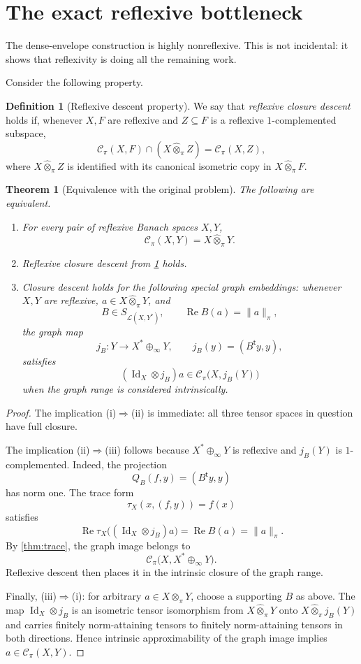 \documentclass[11pt]{article}
\newtheorem{theorem}{Theorem}[section]
\theoremstyle{definition}
\newtheorem{definition}[definition]{Definition}
\theoremstyle{remark}
\newcommand{\whot}{\widehat\otimes_\pi}
\newcommand{\Lin}{\mathcal L}
\newcommand{\Rea}{\operatorname{Re}}
\newcommand{\id}{\operatorname{Id}}
\newcommand{\Cpi}{\mathscr C_\pi}
\begin{document}
\section{The exact reflexive bottleneck}

The dense-envelope construction is highly nonreflexive.  This is not incidental: it shows that reflexivity is doing all the remaining work.

Consider the following property.

\begin{definition}[Reflexive descent property]\label{def:RD}
We say that \emph{reflexive closure descent} holds if, whenever $X,F$ are reflexive and $Z\subseteq F$ is a reflexive $1$-complemented subspace,
\[
 \Cpi(X,F)\cap(X\whot Z)=\Cpi(X,Z),
\]
where $X\whot Z$ is identified with its canonical isometric copy in $X\whot F$.
\end{definition}

\begin{theorem}[Equivalence with the original problem]\label{thm:equivalence}
The following are equivalent.
\begin{enumerate}[label=\textup{(\roman*)}]
\item For every pair of reflexive Banach spaces $X,Y$,
\[
 \Cpi(X,Y)=X\whot Y.
\]
\item Reflexive closure descent from \cref{def:RD} holds.
\item Closure descent holds for the following special graph embeddings: whenever $X,Y$ are reflexive, $a\in X\whot Y$, and
\[
 B\in S_{\Lin(X,Y^*)},
 \qquad
 \Rea B(a)=\|a\|_\pi,
\]
the graph map
\[
 j_B:Y\to X^*\oplus_\infty Y,
 \qquad
 j_B(y)=(B^{\mathsf t}y,y),
\]
satisfies
\[
 (\id_X\otimes j_B)a
 \in\Cpi\bigl(X,j_B(Y)\bigr)
\]
when the graph range is considered intrinsically.
\end{enumerate}
\end{theorem}

\begin{proof}
The implication (i)$\Rightarrow$(ii) is immediate: all three tensor spaces in question have full closure.

The implication (ii)$\Rightarrow$(iii) follows because $X^*\oplus_\infty Y$ is reflexive and $j_B(Y)$ is $1$-complemented.  Indeed, the projection
\[
 Q_B(f,y)=(B^{\mathsf t}y,y)
\]
has norm one.  The trace form
\[
 \tau_X(x,(f,y))=f(x)
\]
satisfies
\[
 \Rea\tau_X\bigl((\id_X\otimes j_B)a\bigr)
 =\Rea B(a)
 =\|a\|_\pi.
\]
By \cref{thm:trace}, the graph image belongs to
\[
 \Cpi\bigl(X,X^*\oplus_\infty Y\bigr).
\]
Reflexive descent then places it in the intrinsic closure of the graph range.

Finally, (iii)$\Rightarrow$(i): for arbitrary $a\in X\whot Y$, choose a supporting $B$ as above.  The map $\id_X\otimes j_B$ is an isometric tensor isomorphism from $X\whot Y$ onto $X\whot j_B(Y)$ and carries finitely norm-attaining tensors to finitely norm-attaining tensors in both directions.  Hence intrinsic approximability of the graph image implies $a\in\Cpi(X,Y)$.
\end{proof}
\end{document}
